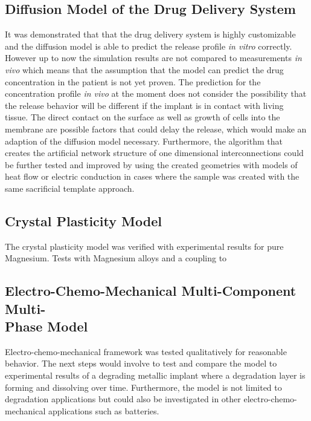 \subsection*{Diffusion Model of the Drug Delivery System}
It was demonstrated that that the drug delivery system is highly customizable and the diffusion model is able to predict the release profile \textit{in vitro} correctly. However up to now the simulation results are not compared to measurements \textit{in vivo} which means that the assumption that the model can predict the drug concentration in the patient is not yet proven. The prediction for the concentration profile \textit{in vivo} at the moment does not consider the possibility that the release behavior will be different if the implant is in contact with living tissue. The direct contact on the surface as well as growth of cells into the membrane are possible factors that could delay the release, which would make an adaption of the diffusion model necessary. Furthermore, the algorithm that creates the artificial network structure of one dimensional interconnections could be further tested and improved by using the created geometries with models of heat flow or electric conduction in cases where the sample was created with the same sacrificial template approach. 

\subsection*{Crystal Plasticity Model}
The crystal plasticity model was verified with experimental results for pure Magnesium. Tests with Magnesium alloys and a coupling to 

\subsection*{Electro-Chemo-Mechanical Multi-Component Multi-\\Phase Model}
Electro-chemo-mechanical framework was tested qualitatively for reasonable behavior. The next steps would involve to test and compare the model to experimental results of a degrading metallic implant where a degradation layer is forming and dissolving over time. Furthermore, the model is not limited to degradation applications but could also be investigated in other electro-chemo-mechanical applications such as batteries. 
